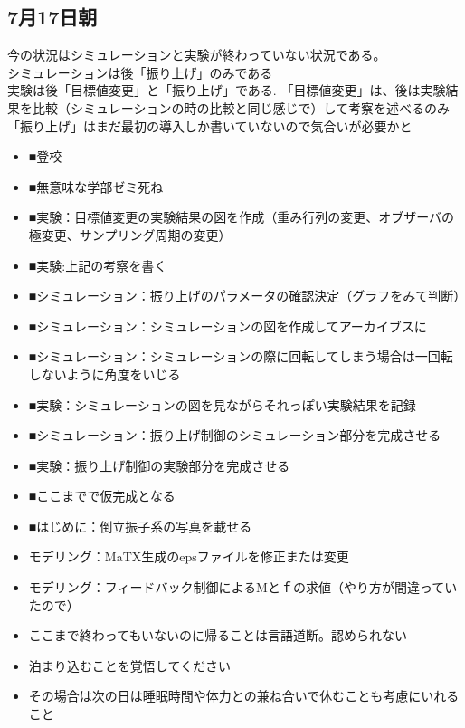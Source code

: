  \subsection{7月17日朝}
 今の状況はシミュレーションと実験が終わっていない状況である。\\
 シミュレーションは後「振り上げ」のみである\\
 実験は後「目標値変更」と「振り上げ」である.
 「目標値変更」は、後は実験結果を比較（シミュレーションの時の比較と同じ感じで）して考察を述べるのみ
 「振り上げ」はまだ最初の導入しか書いていないので気合いが必要かと
 \begin{itemize}
   \item ■登校
   \item ■無意味な学部ゼミ死ね
   \item ■実験：目標値変更の実験結果の図を作成（重み行列の変更、オブザーバの極変更、サンプリング周期の変更）
   \item ■実験:上記の考察を書く
   \item ■シミュレーション：振り上げのパラメータの確認決定（グラフをみて判断）
   \item ■シミュレーション：シミュレーションの図を作成してアーカイブスに
   \item ■シミュレーション：シミュレーションの際に回転してしまう場合は一回転しないように角度をいじる
   \item ■実験：シミュレーションの図を見ながらそれっぽい実験結果を記録
   \item ■シミュレーション：振り上げ制御のシミュレーション部分を完成させる
   \item ■実験：振り上げ制御の実験部分を完成させる
   \item ■ここまでで仮完成となる
   \item ■はじめに：倒立振子系の写真を載せる
   \item モデリング：MaTX生成のepsファイルを修正または変更
   \item モデリング：フィードバック制御によるMとｆの求値（やり方が間違っていたので）
   \item ここまで終わってもいないのに帰ることは言語道断。認められない
   \item 泊まり込むことを覚悟してください
   \item その場合は次の日は睡眠時間や体力との兼ね合いで休むことも考慮にいれること
 \end{itemize}
